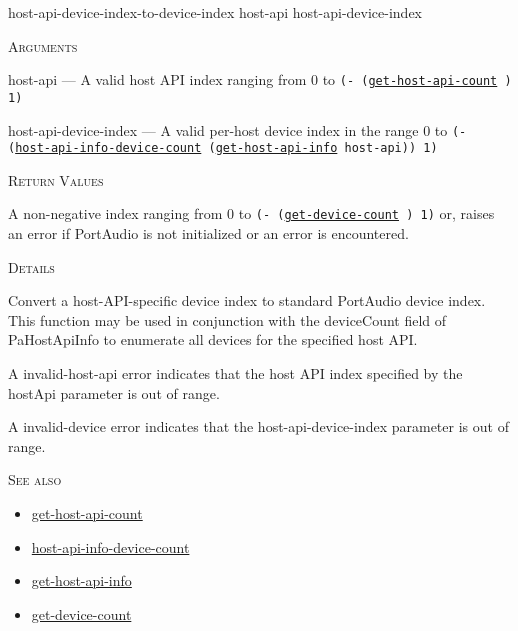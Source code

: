 \documentclass[a4paper]{report}
\begin{document}
    \begin{defun}[Function]
    host-api-device-index-to-device-index host-api host-api-device-index


    
    \bigskip
    \textsc{Arguments}

host-api
	--- A valid host API index ranging from 0 to \texttt{(- (\hyperref[portaudio__fun__get-host-api-count]{\texttt{get-host-api-count}}
  ) 1)}

host-api-device-index
	--- A valid per-host device index in the range 0 to \texttt{(- (\hyperref[portaudio__fun__host-api-info-device-count]{\texttt{host-api-info-device-count}}
   (\hyperref[portaudio__fun__get-host-api-info]{\texttt{get-host-api-info}}
   host-api)) 1)}




    
    \bigskip
    \textsc{Return Values}

A non-negative index ranging from 0 to \texttt{(- (\hyperref[portaudio__fun__get-device-count]{\texttt{get-device-count}}
  ) 1)} or, raises an error if PortAudio is not initialized or an error is encountered.


	
    \bigskip
    \textsc{Details}

Convert a host-API-specific device index to standard PortAudio device index. This function may be used in conjunction with the deviceCount field of PaHostApiInfo to enumerate all devices for the specified host API.






A invalid-host-api error indicates that the host API index specified by the hostApi parameter is out of range.


A invalid-device error indicates that the host-api-device-index parameter is out of range.


      
    \bigskip
    \textsc{See also}


	
    \begin{itemize}
    
	  
    \item
    \hyperref[portaudio__fun__get-host-api-count]{get-host-api-count}
    
    \item
    \hyperref[portaudio__fun__host-api-info-device-count]{host-api-info-device-count}
    
    \item
    \hyperref[portaudio__fun__get-host-api-info]{get-host-api-info}
    
    \item
    \hyperref[portaudio__fun__get-device-count]{get-device-count}
    
	
    \end{itemize}
  
      


    
    \end{defun}
  
\end{document}
